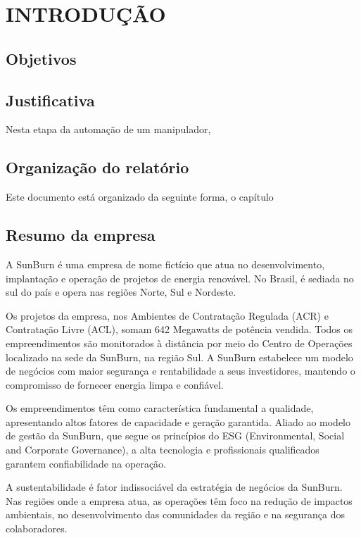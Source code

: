 \chapter{INTRODUÇÃO}
\label{chap:intro}

\section{Objetivos}
\label{sec:obj}


\section{Justificativa} %
\label{sec:just}
Nesta etapa da automação de um manipulador, 


\section{Organização do relatório}
\label{sec:org}
Este documento está organizado da seguinte forma, o capítulo 

\section{Resumo da empresa}
\label{sec:rese}
A SunBurn é uma empresa de nome fictício que atua no desenvolvimento, implantação e operação de projetos de energia renovável. No Brasil, é sediada no sul do país e opera nas regiões Norte, Sul e Nordeste.

Os projetos da empresa, nos Ambientes de Contratação Regulada (ACR) e Contratação Livre (ACL), somam 642 Megawatts de potência vendida. Todos os empreendimentos são monitorados à distância por meio do Centro de Operações localizado na sede da SunBurn, na região Sul.
A SunBurn estabelece um modelo de negócios com maior segurança e rentabilidade a seus investidores, mantendo o compromisso de fornecer energia limpa e confiável.

Os empreendimentos têm como característica fundamental a qualidade, apresentando altos fatores de capacidade e geração garantida. Aliado ao modelo de gestão da SunBurn, que segue os princípios do ESG (Environmental, Social and Corporate Governance), a alta tecnologia e profissionais qualificados garantem confiabilidade na operação.

A sustentabilidade é fator indissociável da estratégia de negócios da SunBurn. Nas regiões onde a empresa atua, as operações têm foco na redução de impactos ambientais, no desenvolvimento das comunidades da região e na segurança dos colaboradores.




